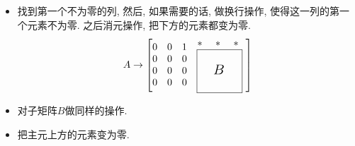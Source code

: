 \begin{itemize}
    \item 找到第一个不为零的列, 然后, 如果需要的话, 做换行操作, 使得这一列的第一个元素不为零. 之后消元操作, 把下方的元素都变为零.
    \begin{equation}
      A \to  
      \left[ \begin{matrix}
       0 & 0 & 1\\
       0 & 0 & 0\\
       0 & 0 & 0\\
       0 & 0 & 0\\
      \end{matrix}
      \quad
      \begin{matrix}
       \begin{matrix}
        *\  & *\  & *\ \\
       \end{matrix}\\
       \boxed{\begin{matrix}
          &  & \\
          & \text{\ \Large $B$ } & \\
          &  & \\
        \end{matrix}}
      \end{matrix}\ 
      \right] 
    \end{equation}

    \item 对子矩阵$B$做同样的操作.
    
    \item 把主元上方的元素变为零.
\end{itemize}


